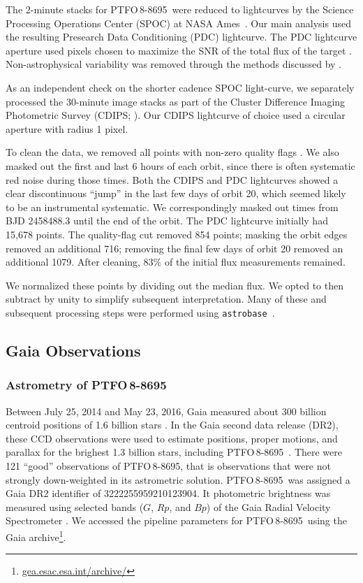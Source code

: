 \documentclass[12pt,twocolumn,tighten]{aastex62}
\newcommand{\ptfo}{PTFO$\,$8-8695}
\begin{document}
The 2-minute stacks for \ptfo\ were reduced to lightcurves by the
Science Processing Operations Center (SPOC) at NASA
Ames~\citep{jenkins_tess_2016}.  Our main analysis used the resulting
Presearch Data Conditioning (PDC) lightcurve.  The PDC lightcurve
aperture used pixels chosen to maximize the SNR of the total flux of
the target \citep{smith_kepler_apertures_2017}.  Non-astrophysical
variability was removed through the methods discussed by
\citet{smith_kepler_PDC_2017}.

As an independent check on the shorter cadence SPOC light-curve, we
separately processed the 30-minute image stacks as part of the Cluster
Difference Imaging Photometric Survey (CDIPS;
\citealt{bouma_cluster_2019}).  Our CDIPS lightcurve  of choice used a
circular aperture with radius 1 pixel.

To clean the data, we removed all points with non-zero quality flags
\citep[{\it e.g.},][]{tess_data_product_description_2018}.  We also
masked out the first and last 6 hours of each orbit, since there is
often systematic red noise during those times.  Both the CDIPS and PDC
lightcurves showed a clear discontinuous ``jump'' in the last few days
of orbit 20, which seemed likely to be an instrumental systematic.  We
correspondingly masked out times from BJD 2458488.3 until the end of
the orbit.  The PDC lightcurve initially had 15{,}678 points.  The
quality-flag cut removed 854 points; masking the orbit edges removed an
additional 716; removing the final few days of orbit 20 removed an
additional 1079.  After cleaning, 83\% of the initial flux
measurements remained.

We normalized these points by dividing out the median flux. We opted
to then subtract by unity to simplify subsequent interpretation.  Many
of these and subsequent processing steps were performed using
\texttt{astrobase}~\citep{bhatti_astrobase_2018}. 


\subsection{Gaia Observations}

\subsubsection{Astrometry of \ptfo}

Between July 25, 2014 and May 23, 2016, Gaia measured about 300
billion centroid positions of 1{.}6 billion stars
\citep{gaia_collaboration_gaia_2016,lindegren_gaiasoln_2018,gaia_collaboration_gaia_2018}.
In the Gaia second data release (DR2), these CCD observations were
used to estimate positions, proper motions, and parallax for the
brighest 1{.}3 billion stars, including \ptfo\
\citep{lindegren_gaiasoln_2018}.  There were 121 ``good'' observations
of \ptfo, that is observations that were not strongly down-weighted in
its astrometric solution.  \ptfo\ was assigned a Gaia DR2 identifier
of 3222255959210123904.  It photometric brightness was measured using
selected bands ($G$, $Rp$, and $Bp$) of the Gaia Radial Velocity
Spectrometer \citep{cropper_gaia_2018,evans_gaia_2018}.  We accessed
the pipeline parameters for \ptfo\ using the Gaia
archive\footnote{\url{gea.esac.esa.int/archive/}}.
\end{document}
